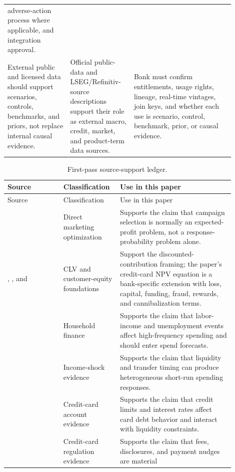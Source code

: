\documentclass[11pt]{article}
\newcommand{\1}{\mathbf{1}}
\begin{document}
\begin{longtable}{p{0.25\linewidth}p{0.25\linewidth}p{0.40\linewidth}}
    adverse-action process where applicable, and integration approval. \\
External public and licensed data should support scenarios, controls,
benchmarks, and priors, not replace internal causal evidence.
  & Official public-data and LSEG/Refinitiv-source descriptions support their
    role as external macro, credit, market, and product-term data sources.
  & Bank must confirm entitlements, usage rights, lineage, real-time vintages,
    join keys, and whether each use is scenario, control, benchmark, prior, or
    causal evidence. \\
\bottomrule
\end{longtable}

\begin{longtable}{p{0.23\linewidth}p{0.20\linewidth}p{0.47\linewidth}}
\caption{First-pass source-support ledger.}
\label{tab:source-support}\\
\toprule
Source & Classification & Use in this paper \\
\midrule
\endfirsthead
\toprule
Source & Classification & Use in this paper \\
\midrule
\endhead
\citet{bult1995directmail}
  & Direct marketing optimization
  & Supports the claim that campaign selection is normally an expected-profit
    problem, not a response-probability problem alone. \\
\citet{berger1998clv}, \citet{rust2004return}, and \citet{venkatesan2004clv}
  & CLV and customer-equity foundations
  & Support the discounted-contribution framing; the paper's credit-card NPV
    equation is a bank-specific extension with loss, capital, funding, fraud,
    rewards, and cannibalization terms. \\
\citet{ganong2019unemployment}
  & Household finance
  & Supports the claim that labor-income and unemployment events affect
    high-frequency spending and should enter spend forecasts. \\
\citet{johnson2004rebates}
  & Income-shock evidence
  & Supports the claim that liquidity and transfer timing can produce
    heterogeneous short-run spending responses. \\
\citet{gross2001liquidity}
  & Credit-card account evidence
  & Supports the claim that credit limits and interest rates affect card debt
    behavior and interact with liquidity constraints. \\
\citet{agarwal2013cardact}
  & Credit-card regulation evidence
  & Supports the claim that fees, disclosures, and payment nudges are material

\end{longtable}
\end{document}
